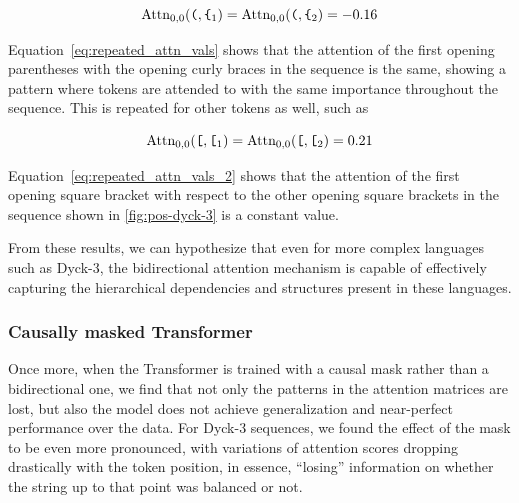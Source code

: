 \begin{equation}\label{eq:repeated_attn_vals}
    \text{Attn}_{0,0}(\verb|(|, \verb|{|_1) = \text{Attn}_{0,0}(\verb|(|, \verb|{|_2) = -0.16
\end{equation}

Equation~\ref{eq:repeated_attn_vals} shows that the attention of the first opening parentheses with the opening curly braces in the sequence is the same, showing a pattern where tokens are attended to with the same importance throughout the sequence. This is repeated for other tokens as well, such as

\begin{equation}\label{eq:repeated_attn_vals_2}
    \text{Attn}_{0,0}(\verb|[|, \verb|[|_1) = \text{Attn}_{0,0}(\verb|[|, \verb|[|_2) = 0.21
\end{equation}

Equation~\ref{eq:repeated_attn_vals_2} shows that the attention of the first opening square bracket with respect to the other opening square brackets in the sequence shown in \ref{fig:pos-dyck-3} is a constant value.

From these results, we can hypothesize that even for more complex languages such as Dyck-3, the bidirectional attention mechanism is capable of effectively capturing the hierarchical dependencies and structures present in these languages.

\subsubsection{Causally masked Transformer}

Once more, when the Transformer is trained with a causal mask rather than a bidirectional one, we find that not only the patterns in the attention matrices are lost, but also the model does not achieve generalization and near-perfect performance over the data. For Dyck-3 sequences, we found the effect of the mask to be even more pronounced, with variations of attention scores dropping drastically with the token position, in essence, ``losing'' information on whether the string up to that point was balanced or not. 

